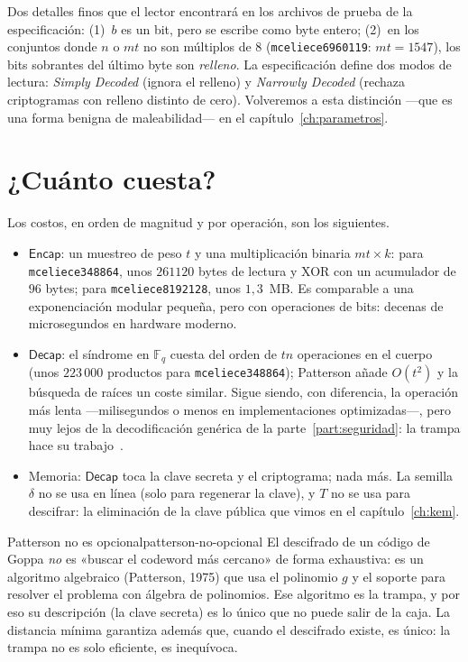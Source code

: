 \documentclass[11pt,a4paper,oneside]{report}
\newcommand{\GF}[1]{\mathbb{F}_{#1}}
\begin{document}
Dos detalles finos que el lector encontrará en los archivos de prueba
de la especificación: (1)~$b$ es un bit, pero se escribe como byte
entero; (2)~en los conjuntos donde $n$ o $mt$ no son múltiplos de $8$
(\texttt{mceliece6960119}: $mt=1547$), los bits sobrantes del último
byte son \emph{relleno}. La especificación define dos modos de lectura:
\emph{Simply Decoded} (ignora el relleno) y \emph{Narrowly Decoded}
(rechaza criptogramas con relleno distinto de cero). Volveremos a esta
distinción ---que es una forma benigna de maleabilidad--- en el
capítulo~\ref{ch:parametros}.

\section{¿Cuánto cuesta?}

Los costos, en orden de magnitud y por operación, son los siguientes.

\begin{itemize}[leftmargin=1.5em,itemsep=3pt]
  \item $\textsf{Encap}$: un muestreo de peso $t$ y una multiplicación
        binaria $mt\times k$: para \texttt{mceliece348864}, unos
        $261120$ bytes de lectura y XOR con un acumulador de $96$
        bytes; para \texttt{mceliece8192128}, unos $1{,}3$~MB. Es
        comparable a una exponenciación modular pequeña, pero con
        operaciones de bits: decenas de microsegundos en hardware
        moderno.
  \item $\textsf{Decap}$: el síndrome en $\GF q$ cuesta del orden de
        $tn$ operaciones en el cuerpo (unos $223\,000$ productos para
        \texttt{mceliece348864}); Patterson añade $O(t^2)$ y la
        búsqueda de raíces un coste similar. Sigue siendo, con
        diferencia, la operación más lenta ---milisegundos o menos en
        implementaciones optimizadas---, pero muy lejos de la
        decodificación genérica de la parte~\ref{part:seguridad}: la
        trampa hace su trabajo~\cite{cmimpl}.
  \item Memoria: $\textsf{Decap}$ toca la clave secreta y el
        criptograma; nada más. La semilla $\delta$ no se usa en línea
        (solo para regenerar la clave), y $T$ no se usa para descifrar: la
        eliminación de la clave pública que vimos en el
        capítulo~\ref{ch:kem}.
\end{itemize}

\begin{observacion}{Patterson no es opcional}{patterson-no-opcional}
El descifrado de un código de Goppa \emph{no} es «buscar el codeword
más cercano» de forma exhaustiva: es un algoritmo algebraico
(Patterson, 1975) que usa el polinomio $g$ y el soporte para resolver
el problema con álgebra de polinomios. Ese algoritmo es la trampa, y
por eso su descripción (la clave secreta) es lo único que no puede
salir de la caja. La distancia mínima garantiza además que, cuando el
descifrado existe, es único: la trampa no es solo eficiente, es
inequívoca.
\end{observacion}
\end{document}
